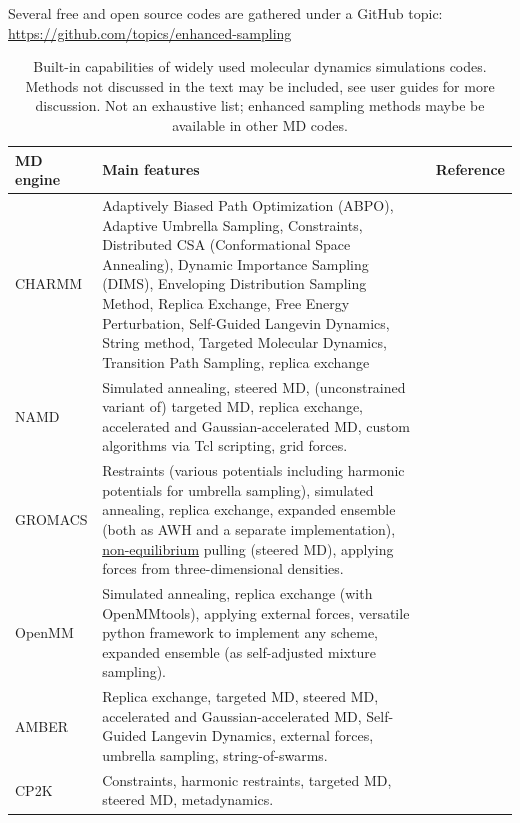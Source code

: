 \documentclass[9pt,review]{livecoms}
\begin{document}
Several free and open source codes are gathered under a GitHub topic: \url{https://github.com/topics/enhanced-sampling}

\begin{table}[!ht]
\caption {Built-in capabilities of widely used molecular dynamics simulations codes. Methods not discussed in the text may be included, see user guides for more discussion. Not an exhaustive list; enhanced sampling methods maybe be available in other MD codes.}
\label{Table:Codes}
\begin{tabularx}{0.95\textwidth}{
  || >{\raggedright\arraybackslash} l
  || >{\raggedright\arraybackslash}X
  | >{\raggedright\arraybackslash}l ||}
 \hline
  MD engine  & Main features                                 & Reference \\
\hline
\hline
CHARMM & Adaptively Biased Path Optimization (ABPO), Adaptive Umbrella Sampling, Constraints, Distributed CSA (Conformational Space Annealing), Dynamic Importance Sampling (DIMS), Enveloping Distribution Sampling Method, Replica Exchange, Free Energy Perturbation, Self-Guided Langevin Dynamics, String method, Targeted Molecular Dynamics, Transition Path Sampling, replica exchange& \cite{Brooks2009} \\
\hline
NAMD &  Simulated annealing, steered MD, (unconstrained variant of) targeted MD, replica exchange, accelerated and Gaussian-accelerated MD, custom algorithms via Tcl scripting, grid forces.        & \cite{Phillips2020} \\
\hline
GROMACS & Restraints (various potentials including harmonic potentials for umbrella sampling), simulated annealing, replica exchange, expanded ensemble (both as AWH and a separate implementation), \hyperlink{ref:OutOfEq} {non-equilibrium} pulling (steered MD), applying forces from three-dimensional densities.   &  \cite{lindahl_2021}\\
\hline
OpenMM & Simulated annealing, replica exchange (with OpenMMtools), applying external forces, versatile python framework to implement any scheme, expanded ensemble (as self-adjusted mixture sampling). & \cite{10.1371/journal.pcbi.1005659}\\
\hline
AMBER  &  Replica exchange, targeted MD, steered MD, accelerated and Gaussian-accelerated MD, Self-Guided Langevin Dynamics, external forces, umbrella sampling, string-of-swarms. & \cite{Case_2021} \\
\hline
CP2K & Constraints, harmonic restraints, targeted MD, steered MD, metadynamics. & \cite{CP2K_2020} \\

\end{tabularx}
\end{table}
\end{document}

